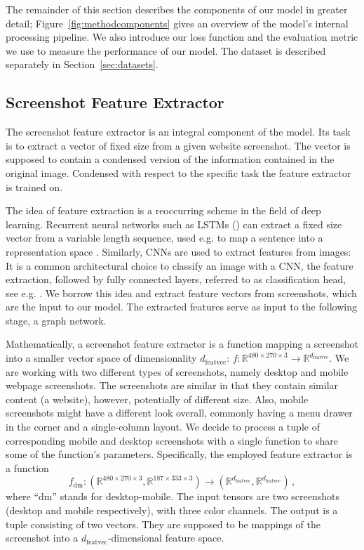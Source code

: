 The remainder of this section describes the components of our model in greater detail; Figure~\ref{fig:methodcomponents} gives an overview of the model's internal processing pipeline. We also introduce our loss function and the evaluation metric we use to measure the performance of our model. The dataset is described separately in Section~\ref{sec:datasets}.

\subsection{Screenshot Feature Extractor}
\label{sec:screenshotfeatextr}

The screenshot feature extractor is an integral component of the model. Its task is to extract a vector of fixed size from a given website screenshot. The vector is supposed to contain a condensed version of the information contained in the original image. Condensed with respect to the specific task the feature extractor is trained on.

The idea of feature extraction is a reoccurring scheme in the field of deep learning. Recurrent neural networks such as LSTMs (\cite{hochreiter1997lstm}) can extract a fixed size vector from a variable length sequence, used e.g. to map a sentence into a representation space \cite{salesforceabstractivesummarization}. Similarly, CNNs are used to extract features from images: It is a common architectural choice to classify an image with a CNN, the feature extraction, followed by fully connected layers, referred to as classification head, see e.g. \cite{krizhevsky:imagenet,Girshick15:fastrcnn,szegedy2017inception}. We borrow this idea and extract feature vectors from screenshots, which are the input to our model. The extracted features serve as input to the following stage, a graph network.

Mathematically, a screenshot feature extractor is a function mapping a screenshot into a smaller vector space of dimensionality $d_\text{featvec}$: $f:\mathbb{R}^{480\times270\times3}\rightarrow\mathbb{R}^{d_\text{featvec}}$. We are working with two different types of screenshots, namely desktop and mobile webpage screenshots. The screenshots are similar in that they contain similar content (a website), however, potentially of different size. Also, mobile screenshots might have a different look overall, commonly having a menu drawer in the corner and a single-column layout. We decide to process a tuple of corresponding mobile and desktop screenshots with a single function to share some of the function's parameters. Specifically, the employed feature extractor is a function \begin{equation}
f_\text{dm}:\left(\mathbb{R}^{480\times270\times3},\mathbb{R}^{187\times333\times3}\right)\rightarrow\left(\mathbb{R}^{d_\text{featvec}},\mathbb{R}^{d_\text{featvec}}\right)\,,
\end{equation} where \enquote{dm} stands for desktop-mobile. The input tensors are two screenshots (desktop and mobile respectively), with three color channels. The output is a tuple consisting of two vectors. They are supposed to be mappings of the screenshot into a $d_\text{featvec}$-dimensional feature space.

